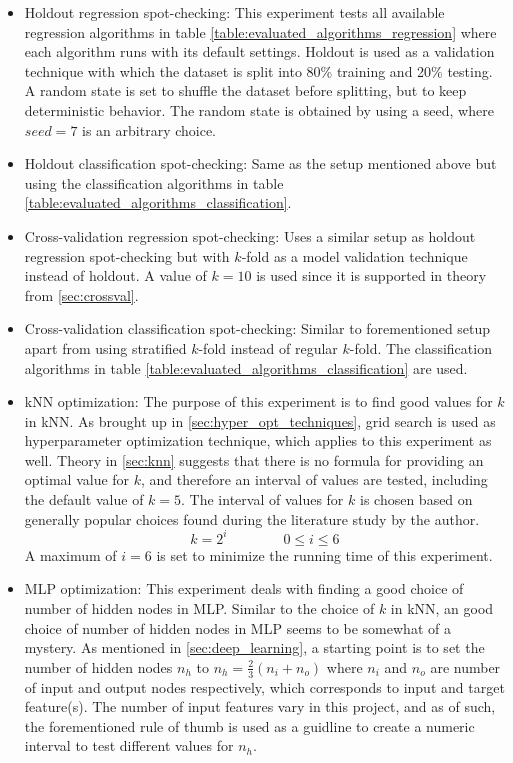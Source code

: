 	\begin{itemize}
		\item{Holdout regression spot-checking: } This experiment tests all available regression algorithms in table \ref{table:evaluated_algorithms_regression} where each algorithm runs with its default settings. 
			Holdout is used as a validation technique with which the dataset is split into 80\% training and 20\% testing. A random state is set 					 to shuffle the dataset before splitting, but to keep deterministic behavior. The random state is obtained by using a seed, where $seed= 7$ is an arbitrary choice. 
		\item{Holdout classification spot-checking: } Same as the setup mentioned above but using the classification algorithms in table \ref{table:evaluated_algorithms_classification}.
		\item{Cross-validation regression spot-checking: } Uses a similar setup as holdout regression spot-checking but with $k$-fold as a model validation 				technique instead of holdout. A value of $k = 10$ is used since it is supported in theory from \ref{sec:crossval}.
		\item{Cross-validation classification spot-checking: } Similar to forementioned setup apart from using stratified $k$-fold instead of regular $k$-fold. The classification algorithms in table \ref{table:evaluated_algorithms_classification} are used. 
		\item{kNN optimization: } The purpose of this experiment is to find good values for $k$ in kNN. As brought up in \ref{sec:hyper_opt_techniques}, 				grid search is used as hyperparameter optimization technique, which applies to this experiment as well. Theory in \ref{sec:knn} suggests that 				there is no formula for providing an optimal value for $k$, and therefore an interval of values are tested, including the default value of $k=5$. 				The interval of values for $k$ is chosen based on generally popular choices found during the literature study by the author.
			\begin{equation}
				k = 2^i \qquad \qquad 0 \leq i \leq 6
			\end{equation}
			A maximum of $i = 6$ is set to minimize the running time of this experiment. 
		\item{MLP optimization: } This experiment deals with finding a good choice of number of hidden nodes in MLP. Similar to the choice of $k$ in kNN, an good choice of number of hidden nodes in MLP seems to be somewhat of a mystery. As mentioned in \ref{sec:deep_learning}, a starting point is to set the number of hidden nodes $n_h$ to $n_h = \frac{2}{3}(n_i + n_o)$ where $n_i$ and $n_o$ are number of input and output nodes respectively, which corresponds to input and target feature(s). The number of input features vary in this project, and as of such, the forementioned rule of thumb is used as a guidline to create a numeric interval to test different values for $n_h$.

\end{itemize}
